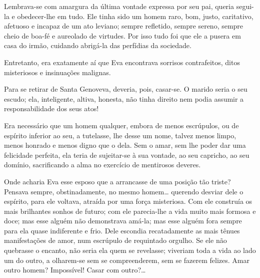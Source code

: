 {Lembrava-se com amargura da última vontade expressa por
seu pai, queria segui-la e obedecer-lhe em tudo. Ele tinha sido
um homem raro, bom, justo, caritativo, afetuoso e incapaz de
um ato leviano; sempre refletido, sempre sereno,
sempre cheio de boa-fé e aureolado de virtudes. Por isso tudo foi que
ele a pusera em casa do irmão, cuidando abrigá-la das
perfídias da sociedade.

Entretanto, era exatamente aí que Eva encontrava
sorrisos contrafeitos, ditos misteriosos e insinuações malignas.


Para se retirar de Santa Genoveva, deveria, pois, casar-se. O
marido seria o seu escudo; ela, inteligente, altiva, honesta, não tinha
direito nem podia assumir a responsabilidade dos seus atos!

Era necessário que um homem qualquer, embora de menos
escrúpulos, ou de espírito inferior ao seu, a tutelasse, lhe
desse um nome, talvez menos limpo, menos honrado e menos digno
que o dela. Sem o amar, sem lhe poder dar uma felicidade perfeita, ela
teria de sujeitar-se à sua vontade, ao seu capricho, ao seu
domínio, sacrificando a alma no exercício de mentirosos
deveres.


Onde acharia Eva esse esposo que a arrancasse de uma posição tão
triste? Pensava sempre, obstinadamente, no mesmo homem\ldots{} querendo
desviar dele o espírito, para ele voltava, atraída por uma
força misteriosa. Com ele construía os mais brilhantes sonhos de futuro;
com ele parecia-lhe a vida muito mais formosa e doce; mas esse
alguém não demonstrava amá-la; mas esse alguém
fora sempre para ela quase indiferente e frio. Dele
escondia recatadamente as mais tênues manifestações de amor, num
escrúpulo de requintado orgulho. Se ele não quebrasse o encanto, não
seria ela quem se revelasse; viveriam toda a vida ao lado um do outro, a
olharem-se sem se compreenderem, sem se fazerem felizes. Amar outro
homem? Impossível! Casar com outro?\ldots{}


}
